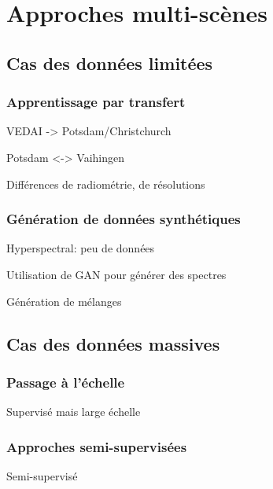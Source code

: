 \chapter{Approches multi-scènes}

\section{Cas des données limitées}

\subsection{Apprentissage par transfert}

VEDAI -> Potsdam/Christchurch

Potsdam <-> Vaihingen

Différences de radiométrie, de résolutions

\subsection{Génération de données synthétiques}

Hyperspectral: peu de données

Utilisation de GAN pour générer des spectres

Génération de mélanges

\section{Cas des données massives}

\subsection{Passage à l'échelle}

Supervisé mais large échelle

\subsection{Approches semi-supervisées}

Semi-supervisé
